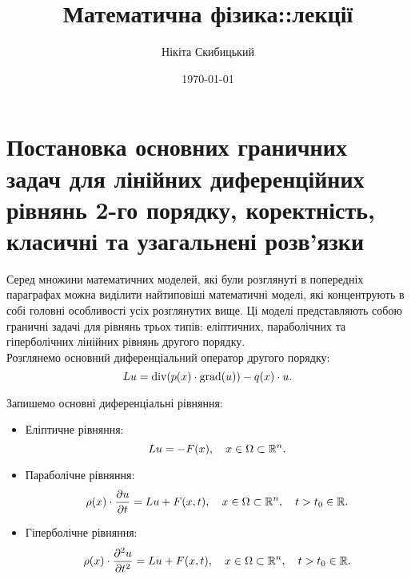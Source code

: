 


\title{Математична фізика::лекції}
\author{Нікіта Скибицький}
\date{\today}



\maketitle

\tableofcontents

\section{Постановка основних граничних задач для лінійних диференційних рівнянь 2-го порядку, коректність, класичні та узагальнені розв'язки}

Серед множини математичних моделей, які були розглянуті в попередніх параграфах можна виділити найтиповіші математичні моделі, які концентрують в собі головні особливості усіх розглянутих вище. Ці моделі представляють собою граничні задачі для рівнянь трьох типів: еліптичних, параболічних та гіперболічних лінійних рівнянь другого порядку. \\

Розглянемо основний диференціальний оператор другого порядку:
\begin{equation}
	\label{eq:8.1}
	L u = \operatorname{div} (p(x) \cdot \operatorname{grad}(u)) - q(x) \cdot u.
\end{equation}

Запишемо основні диференціальні рівняння:
\begin{itemize}
	\item Еліптичне рівняння:
	\begin{equation}
		\label{eq:8.2}
		L u = - F(x), \quad x \in \Omega \subset \mathbb{R}^n.
	\end{equation}
	\item Параболічне рівняння:
	\begin{equation}
		\label{eq:8.3}
		\rho(x) \cdot \frac{\partial u}{\partial t} = L u + F(x, t), \quad x \in \Omega \subset \mathbb{R}^n, \quad t > t_0 \in \mathbb{R}.
	\end{equation}
	\item Гіперболічне рівняння:
	\begin{equation}
		\label{eq:8.4}
		\rho(x) \cdot \frac{\partial^2 u}{\partial t^2} = L u + F(x, t), \quad x \in \Omega \subset \mathbb{R}^n, \quad t > t_0 \in \mathbb{R}.
	\end{equation}
\end{itemize}

